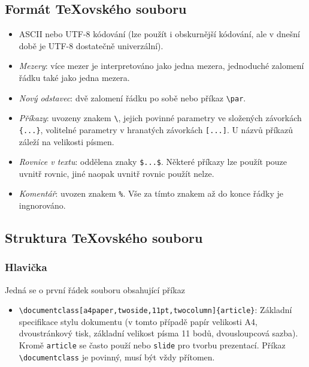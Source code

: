 \documentclass[a4paper,11pt,twoside]{article}
\theoremstyle{red}
\theoremstyle{green}
\begin{document}
    \subsection{Formát \TeX{}ovského souboru}
    \begin{itemize}
        \item ASCII nebo UTF-8 kódování (lze použít i obskurnější kódování, ale v dnešní době je UTF-8 dostatečně univerzální).
        \item \emph{Mezery}: více mezer je interpretováno jako jedna mezera, jednoduché zalomení řádku také jako jedna mezera.
        \item \emph{Nový odstavec}: dvě zalomení řádku po sobě nebo příkaz \verb+\par+.
        \item \emph{Příkazy}: uvozeny znakem \verb+\+, jejich povinné parametry ve složených závorkách \verb+{...}+, volitelné parametry v hranatých závorkách \verb+[...]+.
            U názvů příkazů záleží na velikosti písmen.
        \item \emph{Rovnice v textu}: oddělena znaky \verb+$...$+. Některé příkazy lze použít pouze uvnitř rovnic, jiné naopak uvnitř rovnic použít nelze.
        \item \emph{Komentář}: uvozen znakem \verb+%+. Vše za tímto znakem až do konce řádky je ingnorováno.
    \end{itemize}

    \subsection{Struktura \TeX{}ovského souboru}
        \subsubsection{Hlavička}
        Jedná se o první řádek souboru obsahující příkaz
            \begin{itemize}
                \item \verb+\documentclass[a4paper,twoside,11pt,twocolumn]{article}+: Základní specifikace stylu dokumentu (v tomto případě papír velikosti A4, dvoustránkový tisk, základní velikost písma 11 bodů, dvousloupcová sazba).
                Kromě \verb+article+ se často použí nebo \verb+slide+ pro tvorbu prezentací.
                Příkaz \verb+\documentclass+ je povinný, musí být vždy přítomen.
            \end{itemize}
\end{document}
